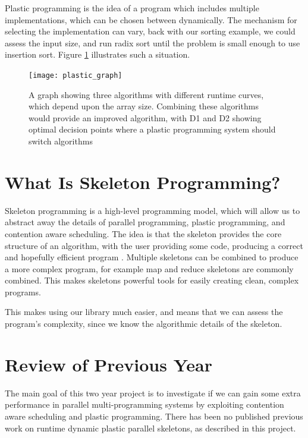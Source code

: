 Plastic programming is the idea of a program which includes multiple implementations, which can be chosen between dynamically. The mechanism for selecting the implementation can vary, back with our sorting example, we could assess the input size, and run radix sort until the problem is small enough to use insertion sort. Figure \ref{fig:plastic_graph} illustrates such a situation.

\begin{figure}[H]
	\centering
	\texttt{[image: plastic\_graph]}
	\caption{A graph showing three algorithms with different runtime curves, which depend upon the array size. Combining these algorithms would provide an improved algorithm, with D1 and D2 showing optimal decision points where a plastic programming system should switch algorithms}
	\label{fig:plastic_graph}
\end{figure}



\section{What Is Skeleton Programming?}
\label{section:background:what_is_skeleton_programming}

Skeleton programming is a high-level programming model, which will allow us to abstract away the details of parallel programming, plastic programming, and contention aware scheduling. The idea is that the skeleton provides the core structure of an algorithm, with the user providing some code, producing a correct and hopefully efficient program \cite{patterns_and_frameworks}. Multiple skeletons can be combined to produce a more complex program, for example map and reduce skeletons are commonly combined. This makes skeletons powerful tools for easily creating clean, complex programs.

This makes using our library much easier, and means that we can assess the program's complexity, since we know the algorithmic details of the skeleton.



\section{Review of Previous Year}
\label{section:background:review_of_previous_year}

The main goal of this two year project is to investigate if we can gain some extra performance in parallel multi-programming systems by exploiting contention aware scheduling and plastic programming. There has been no published previous work on runtime dynamic plastic parallel skeletons, as described in this project.

